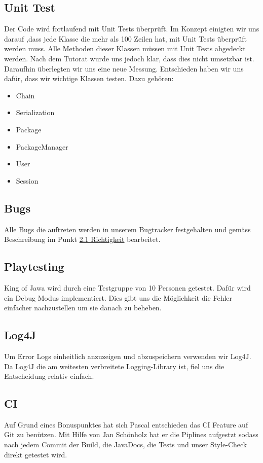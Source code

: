 \documentclass{scrartcl}
\begin{document}
\subsection{Unit Test}
Der Code wird fortlaufend mit Unit Tests überprüft.
Im Konzept einigten wir uns darauf ,dass jede Klasse die mehr als 100 Zeilen hat, mit Unit Tests überprüft werden muss. Alle Methoden dieser Klassen müssen mit Unit Tests abgedeckt werden. Nach dem Tutorat wurde uns jedoch klar, dass dies nicht umsetzbar ist. Daraufhin überlegten wir uns eine neue Messung. Entschieden haben wir uns dafür, dass wir wichtige Klassen testen. Dazu gehören:
\begin{itemize}
	\item Chain
	\item Serialization
	\item Package
	\item PackageManager
	\item User
	\item Session
\end{itemize}  

\subsection{Bugs}
Alle Bugs die auftreten werden in unserem Bugtracker festgehalten und gemäss Beschreibung im Punkt \hyperref[sec:Richtigkeit]{2.1 Richtigkeit} bearbeitet.

\subsection{Playtesting}
King of Jawa wird durch eine Testgruppe von 10 Personen getestet. Dafür wird ein Debug Modus implementiert. Dies gibt uns die Möglichkeit die Fehler einfacher nachzustellen um sie danach zu beheben.

\subsection{Log4J}
Um Error Logs einheitlich anzuzeigen und abzuspeichern verwenden wir Log4J. Da Log4J die am weitesten verbreitete Logging-Library ist, fiel uns die Entscheidung relativ einfach. 

\subsection{CI}
Auf Grund eines Bonuspunktes hat sich Pascal entschieden das CI Feature auf Git zu benützen. Mit Hilfe von Jan Schönholz hat er die Piplines aufgestzt sodass nach jedem Commit der Build, die JavaDocs, die Tests und unser Style-Check direkt getestet wird.
\end{document}
